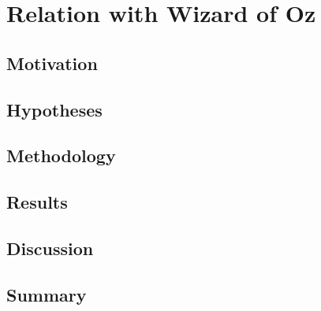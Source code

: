 \chapter{Relation with Wizard of Oz}\label{chap:woz}

\section{Motivation}

\section{Hypotheses}

\section{Methodology}

\section{Results}

\section{Discussion}

\section{Summary}


